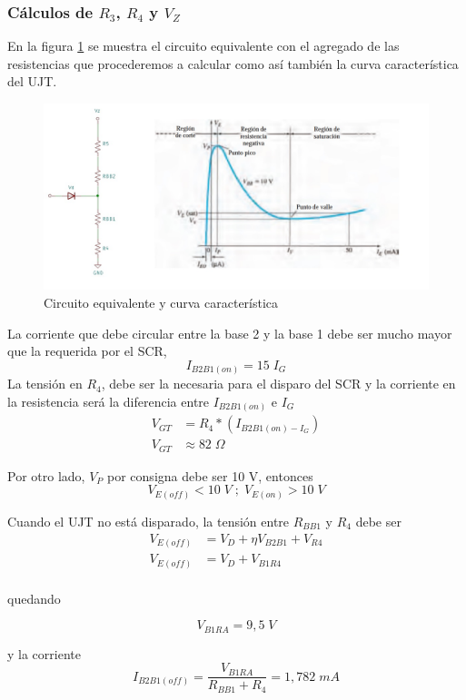 \documentclass{article}
\begin{document}
\subsubsection{Cálculos de $R_3$, $R_4$ y $V_Z$}
En la figura \textcolor{blue}{\ref{fig:fig3}} se muestra el circuito equivalente con el agregado de las resistencias que procederemos a calcular como así también la curva característica del UJT.
%
\begin{figure}[h]
 \begin{center}
	\includegraphics{imagenes/fig3.jpg} 
	\caption{Circuito equivalente y curva característica}\label{fig:fig3}
 \end{center}
\end{figure}
%
La corriente que debe circular entre la base 2 y la base 1 debe ser mucho mayor que la requerida por el SCR, 
\[ I_{B2B1(on)} = 15 \; I_G \]
La tensión en $R_4$, debe ser la necesaria para el disparo del SCR y la corriente en la resistencia será la diferencia entre $I_{B2B1(on)}$ e $I_G$
\begin{align*}
V_{GT} &= R_4 * (I_{B2B1(on) - I_G}) \\
V_{GT} &\approx 82 \; \Omega  
\end{align*}

Por otro lado, $V_P$ por consigna debe ser 10 V, entonces
\[V_{E(off)} < 10 \; V \; ; \; V_{E(on)} > 10 \; V\]

Cuando el UJT no está disparado, la tensión entre $R_{BB1}$ y $R_4$ debe ser
\begin{align*}
V_{E(off)} &= V_D + \eta V_{B2B1} + V_{R4} \\
V_{E(off)} &= V_D + V_{B1R4}\\
\end{align*}

quedando

\[ V_{B1RA} = 9,5 \; V \]

y la corriente 
\[ I_{B2B1(off)} = \frac{V_{B1RA}}{R_{BB1} + R_4} = 1,782 \; mA \]
\end{document}
